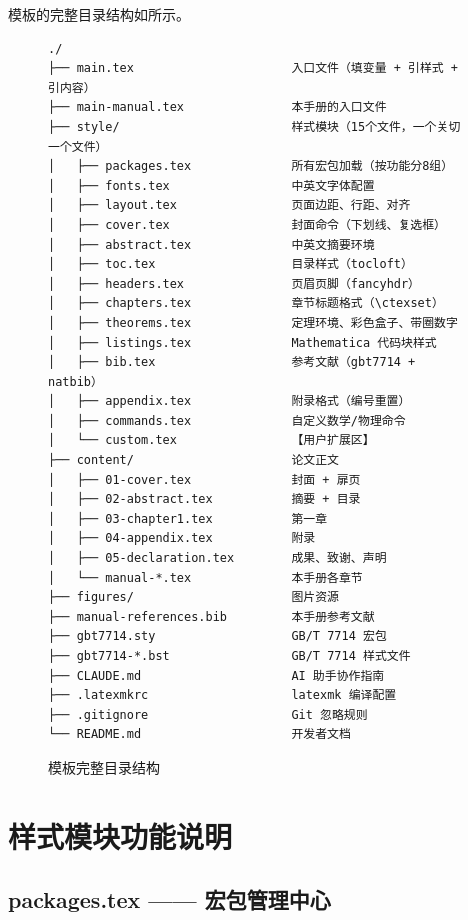 \documentclass[../main-manual.tex]{subfiles}
\begin{document}
模板的完整目录结构如所示。

\begin{figure}[htbp]
	\centering
	\begin{tcolorbox}[
		colback=gray!5,
		colframe=gray!50,
		title={\centering 模板目录结构},
		fonttitle=\ttfamily\small,
		fontupper=\ttfamily\small
	]
\begin{verbatim}
./
├── main.tex                      入口文件（填变量 + 引样式 + 引内容）
├── main-manual.tex               本手册的入口文件
├── style/                        样式模块（15个文件，一个关切一个文件）
│   ├── packages.tex              所有宏包加载（按功能分8组）
│   ├── fonts.tex                 中英文字体配置
│   ├── layout.tex                页面边距、行距、对齐
│   ├── cover.tex                 封面命令（下划线、复选框）
│   ├── abstract.tex              中英文摘要环境
│   ├── toc.tex                   目录样式（tocloft）
│   ├── headers.tex               页眉页脚（fancyhdr）
│   ├── chapters.tex              章节标题格式（\ctexset）
│   ├── theorems.tex              定理环境、彩色盒子、带圈数字
│   ├── listings.tex              Mathematica 代码块样式
│   ├── bib.tex                   参考文献（gbt7714 + natbib）
│   ├── appendix.tex              附录格式（编号重置）
│   ├── commands.tex              自定义数学/物理命令
│   └── custom.tex                【用户扩展区】
├── content/                      论文正文
│   ├── 01-cover.tex              封面 + 扉页
│   ├── 02-abstract.tex           摘要 + 目录
│   ├── 03-chapter1.tex           第一章
│   ├── 04-appendix.tex           附录
│   ├── 05-declaration.tex        成果、致谢、声明
│   └── manual-*.tex              本手册各章节
├── figures/                      图片资源
├── manual-references.bib         本手册参考文献
├── gbt7714.sty                   GB/T 7714 宏包
├── gbt7714-*.bst                 GB/T 7714 样式文件
├── CLAUDE.md                     AI 助手协作指南
├── .latexmkrc                    latexmk 编译配置
├── .gitignore                    Git 忽略规则
└── README.md                     开发者文档
\end{verbatim}
	\end{tcolorbox}
	\caption{模板完整目录结构}
	\label{fig:directory}
\end{figure}

\section{样式模块功能说明}

\subsection{packages.tex —— 宏包管理中心}
\end{document}

